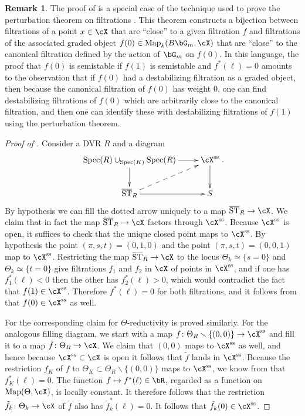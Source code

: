 \documentclass[a4paper]{amsart}
\numberwithin{equation}{section}
\theoremstyle{plain}
\theoremstyle{definition}
\newtheorem{rem}[thm]{Remark}
\DeclareMathOperator{\Spec}{Spec}
\DeclareMathOperator{\ST}{ST}
\newcommand{\co}{\colon}
\renewcommand{\ss}{{\rm ss}}
\DeclareMathOperator{\Map}{Map}
\def\oST{\overline{\ST}}
\begin{document}
\begin{rem}
The proof of  is a special case of the technique used to prove the perturbation theorem on filtrations \cite[Thm.~3.5.3]{hlinstability}. This theorem constructs a bijection between filtrations of a point $x \in \cX$ that are ``close'' to a given filtration $f$ and filtrations of the associated graded object $f(0) \in \Map_k(B \bG_m,\cX)$ that are ``close'' to the canonical filtration defined by the action of $\bG_m$ on $f(0)$. In this language, the proof that $f(0)$ is semistable if $f(1)$ is semistable and $f^\ast(\ell)=0$ amounts to the observation that if $f(0)$ had a destabilizing filtration as a graded object, then because the canonical filtration of $f(0)$ has weight $0$, one can find destabilizing filtrations of $f(0)$ which are arbitrarily close to the canonical filtration, and then one can identify these with destabilizing filtrations of $f(1)$ using the perturbation theorem.
\end{rem}


\begin{proof}[Proof of ]
Consider a DVR $R$ and a diagram
\[
\xymatrix{ \Spec(R) \cup_{\Spec(K)} \Spec(R) \ar[r] \ar[d] & \cX^{\ss} \ar[d] \\ \oST_R \ar@{-->}[ur] \ar[r] & S }.
\]
By hypothesis we can fill the dotted arrow uniquely to a map $\oST_R \to \cX$. We claim that in fact the map $\oST_R \to \cX$ factors through $\cX^{\ss}$. Because $\cX^{\ss}$ is open, it suffices to check that the unique closed point maps to $\cX^{\ss}$. By hypothesis the point $(\pi,s,t) = (0,1,0)$ and the point $(\pi,s,t)=(0,0,1)$ map to $\cX^{\ss}$. Restricting the map $\oST_R \to \cX$ to the locus $\Theta_k \simeq \{s=0\}$ and $\Theta_k \simeq \{t=0\}$ give filtrations $f_1$ and $f_2$ in $\cX$ of points in $\cX^{\ss}$, and if one has $f_{1}^\ast(\ell)<0$ then the other has $f_{2}^\ast(\ell)>0$, which would contradict the fact that $f(1) \in \cX^{\ss}$. Therefore $f^\ast(\ell) = 0$ for both filtrations, and it follows from  that $f(0) \in \cX^{\ss}$ as well.

For the corresponding claim for $\Theta$-reductivity is proved similarly. For the analogous filling diagram, we start with a map $f \co \Theta_R \smallsetminus \{(0,0)\} \to \cX^{\ss}$ and fill it to a map $\tilde{f} \co \Theta_R \to \cX$. We claim that $(0,0)$ maps to $\cX^{\ss}$ as well, and hence because $\cX^{\ss} \subset \cX$ is open it follows that $\tilde{f}$ lands in $\cX^{\ss}$. Because the restriction $f_K$ of $f$ to $\Theta_K \subset \Theta_R \smallsetminus \{(0,0)\}$ maps to $\cX^{\ss}$, we know from  that $f_K^\ast(\ell) = 0$. The function $f \mapsto f^\ast(\ell) \in \bR$, regarded as a function on $\Map(\Theta,\cX)$, is locally constant. It therefore follows that the restriction $\tilde{f}_k \co \Theta_k \to \cX$ of $\tilde{f}$ also has $\tilde{f}_k^\ast(\ell) = 0$. It follows that $\tilde{f}_k(0) \in \cX^{\ss}$.
\end{proof}
\end{document}
